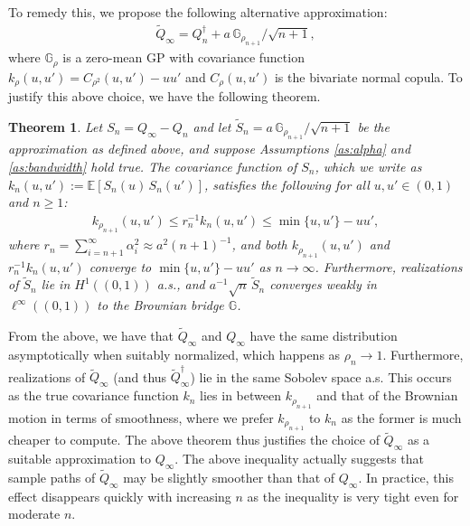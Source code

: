 \documentclass[11pt,a4paper]{article}
\newtheorem{theorem}{Theorem}%
\newcommand{\E}{\mathbb{E}}
\begin{document}
To remedy this, we propose the following alternative approximation:
\begin{align*}
\widetilde{Q}_\infty= Q^{\dagger}_n + a\,{\mathbb{G}_{\rho_{n+1}}}/{\sqrt{n+1}},
\end{align*}
where $\mathbb{G}_{\rho}$ is a zero-mean GP with covariance function
${k}_{\rho}(u,u') = C_{\rho^2}(u,u') - uu'$ and $C_\rho(u,u')$ is the bivariate normal copula. To justify this above choice, we have the following theorem.
\begin{theorem}\label{th:approx_GP}
    Let $S_n = Q_\infty - Q_n$  and let $\widetilde{S}_n = a\,{\mathbb{G}_{\rho_{n+1}}}/{\sqrt{n+1}}$ be the approximation as defined above, and suppose {Assumptions \ref{as:alpha}} and {\ref{as:bandwidth}} hold true. The covariance function of $S_n$, which we write as $k_n(u,u') := \E\left[S_n(u)\, S_n(u')\right]$,
    satisfies the following for all $u,u' \in (0,1)$ and $n \geq 1$:
\begin{align*}
 k_{\rho_{n+1}}(u,u') \leq  r_n^{-1}{k_n(u,u')} \leq \min\{u,u'\} - uu',
\end{align*}
where $r_n = \sum_{i = n+1}^\infty\alpha_i^2 \approx a^2(n+1)^{-1}$,
and both $k_{\rho_{n+1}}(u,u')$ and $r_n^{-1}k_{n}(u,u')$ converge to $\min\{u,u'\} - uu'$ as $n \to \infty$.
Furthermore, realizations of $\widetilde{S}_n$ lie in $H^1((0,1))$ a.s., and $a^{-1}\sqrt{n}\,\widetilde{S}_n$ converges weakly  in $\ell^\infty((0,1))$ to the Brownian bridge $\mathbb{G}$.
\end{theorem}
From the above, we have that $\widetilde{Q}_\infty$ and $Q_\infty$ have the same distribution asymptotically when suitably normalized, which happens as $\rho_{n} \to 1$. Furthermore, realizations of $\widetilde{Q}_\infty$ (and thus $\widetilde{Q}_\infty^{\dagger}$) lie in the same Sobolev space a.s. This occurs as the true covariance function $k_n$ lies in between $k_{\rho_{n+1}}$ and that of the Brownian motion in terms of smoothness, where we prefer $k_{\rho_{n+1}}$ to $k_n$ as the former is much cheaper to compute. The above theorem thus justifies the choice of $\widetilde{Q}_\infty$ as a suitable approximation to $Q_\infty$.
The above inequality actually suggests that  
 sample paths of $\widetilde{Q}_\infty$ may be slightly smoother than that of $Q_\infty$. In practice, this effect disappears quickly with increasing $n$ as the inequality is very tight even for moderate $n$. 
\end{document}
